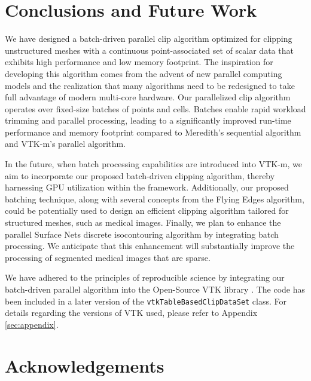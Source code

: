 \documentclass{egpubl}
\begin{document}

\section{Conclusions and Future Work}
\label{sec:conclusions-future-work}

We have designed a batch-driven parallel clip algorithm optimized for clipping unstructured meshes with a continuous point-associated set of scalar data that exhibits high performance and low memory footprint. The inspiration for developing this algorithm comes from the advent of new parallel computing models and the realization that many algorithms need to be redesigned to take full advantage of modern multi-core hardware. Our parallelized clip algorithm operates over fixed-size batches of points and cells. Batches enable rapid workload trimming and parallel processing, leading to a significantly improved run-time performance and memory footprint compared to Meredith's sequential algorithm and VTK-m's parallel algorithm.

In the future, when batch processing capabilities are introduced into VTK-m, we aim to incorporate our proposed batch-driven clipping algorithm, thereby harnessing GPU utilization within the framework. Additionally, our proposed batching technique, along with several concepts from the Flying Edges algorithm, could be potentially used to design an efficient clipping algorithm tailored for structured meshes, such as medical images. Finally, we plan to enhance the parallel Surface Nets discrete isocontouring algorithm \cite{SurfaceNets} by integrating batch processing. We anticipate that this enhancement will substantially improve the processing of segmented medical images that are sparse.

We have adhered to the principles of reproducible science by integrating our batch-driven parallel algorithm into the Open-Source VTK library \cite{VTKBook}. The code has been included in a later version of the \texttt{vtkTableBasedClipDataSet} class. For details regarding the versions of VTK used, please refer to Appendix \ref{sec:appendix}.


\section{Acknowledgements}
\label{sec:acknowledgements}
\end{document}
